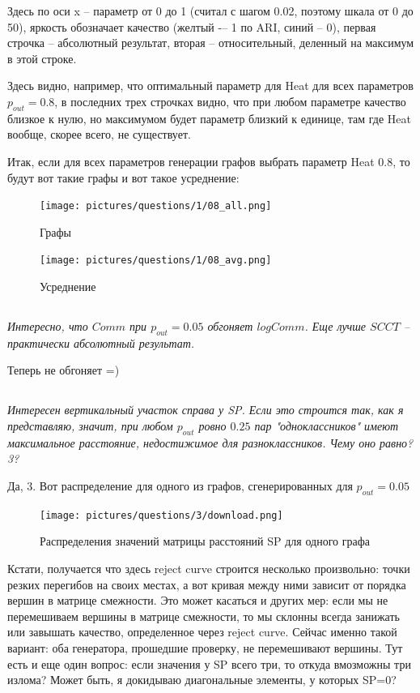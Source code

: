 \documentclass{article}
\begin{document}
Здесь по оси x -- параметр от 0 до 1 (считал с шагом 0.02, поэтому шкала от 0 до 50), яркость обозначает качество (желтый -– 1 по ARI, синий -- 0), первая строчка -- абсолютный результат, вторая – относительный, деленный на максимум в этой строке. 

Здесь видно, например, что оптимальный параметр для Heat для всех параметров $p_{out} = 0.8$, в последних трех строчках видно, что при любом параметре качество близкое к нулю, но максимумом будет параметр близкий к единице, там где Heat вообще, скорее всего, не существует.

Итак, если для всех параметров генерации графов выбрать параметр Heat 0.8, то будут вот такие графы и вот такое усреднение:

\begin{figure}[H]
	\texttt{[image: pictures/questions/1/08\_all.png]}
	\caption{\label{f_vs2} Графы}
\end{figure}

\begin{figure}[H]
	\texttt{[image: pictures/questions/1/08\_avg.png]}
	\caption{\label{f_vs2} Усреднение}
\end{figure}  

\subsection{}
\textit{Интересно, что $Comm$ при $p_{out} = 0.05$ обгоняет $logComm$. Еще лучше $SCCT$ -- практически абсолютный результат.}

Теперь не обгоняет =)


\subsection{}
\textit{Интересен вертикальный участок справа у SP. Если это строится так, как я представляю, значит, при любом $p_{out}$ ровно $0.25$ пар "одноклассников" имеют максимальное расстояние, недостижимое для разноклассников. Чему оно равно? 3?}

Да, 3. Вот распределение для одного из графов, сгенерированных для $p_{out} = 0.05$
\begin{figure}[H]
	\texttt{[image: pictures/questions/3/download.png]}
	\caption{\label{f_vs2} Распределения значений матрицы расстояний SP для одного графа}
\end{figure}
Кстати, получается что здесь reject curve строится несколько произвольно: точки резких перегибов на своих местах, а вот кривая между ними зависит от порядка вершин в матрице смежности. Это может касаться и других мер: если мы не перемешиваем вершины в матрице смежности, то мы склонны всегда занижать или завышать качество, определенное через reject curve. Сейчас именно такой вариант: оба генератора, прошедшие проверку, не перемешивают вершины.
Тут есть и еще один вопрос: если значения у SP всего три, то откуда вмозможны три излома? Может быть, я докидываю диагональные элементы, у которых SP=0?
\end{document}

